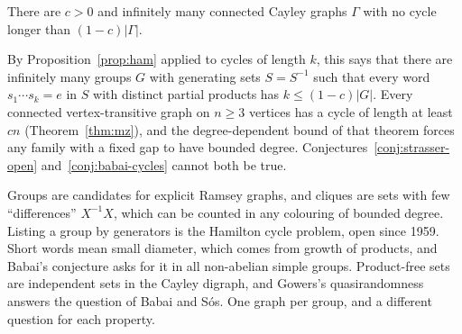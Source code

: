 \begin{conjecture}\label{conj:babai-cycles}
There are $c>0$ and infinitely many connected Cayley graphs $\Gamma$ with no cycle longer than $(1-c)|\Gamma|$.
\end{conjecture}

By Proposition~\ref{prop:ham} applied to cycles of length $k$, this says that there are infinitely many groups $G$ with generating sets $S=S^{-1}$ such that every word $s_1\cdots s_k=e$ in $S$ with distinct partial products has $k\leq(1-c)|G|$. Every connected vertex-transitive graph on $n\geq3$ vertices has a cycle of length at least $cn$ (Theorem~\ref{thm:mz}), and the degree-dependent bound of that theorem forces any family with a fixed gap to have bounded degree. Conjectures~\ref{conj:strasser-open} and~\ref{conj:babai-cycles} cannot both be true.


Groups are candidates for explicit Ramsey graphs, and cliques are sets with few ``differences'' $X^{-1}X$, which can be counted in any colouring of bounded degree. Listing a group by generators is the Hamilton cycle problem, open since 1959. Short words mean small diameter, which comes from growth of products, and Babai's conjecture asks for it in all non-abelian simple groups. Product-free sets are independent sets in the Cayley digraph, and Gowers's quasirandomness answers the question of Babai and S\'os. One graph per group, and a different question for each property.
